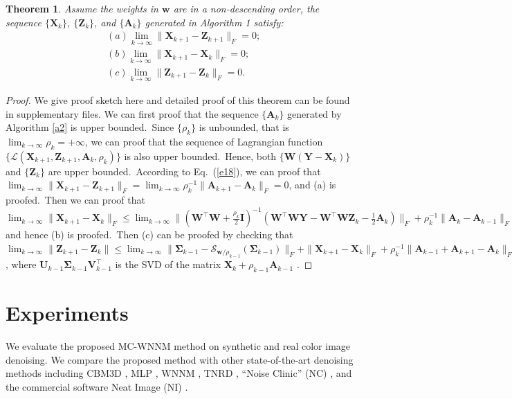 \documentclass[10pt,twocolumn,letterpaper,sort&compress]{article}
\newtheorem{theorem}{Theorem}
\begin{document}
\begin{theorem}
\label{t1}
Assume the weights in $\bm{w}$ are in a non-descending order, the sequence $\{\mathbf{X}_{k}\}$, $\{\mathbf{Z}_{k}\}$, and $\{\mathbf{A}_{k}\}$ generated in Algorithm 1 satisfy:
\begin{align}
&(a) \lim_{k \to \infty} \|\mathbf{X}_{k+1}-\mathbf{Z}_{k+1}\|_{F}=0;
\\
&(b) \lim_{k \to \infty} \|\mathbf{X}_{k+1}-\mathbf{X}_{k}\|_{F}=0;
\\
&(c) \lim_{k \to \infty} \|\mathbf{Z}_{k+1}-\mathbf{Z}_{k}\|_{F}=0.
\end{align}
\end{theorem}
\begin{proof}
We give proof sketch here and detailed proof of this theorem can be found in supplementary files. We can first proof that the sequence $\{\mathbf{A}_{k}\}$ generated by Algorithm \ref{a2} is upper bounded.\ Since $\{\rho_{k}\}$ is unbounded, that is $\lim_{k\to\infty}{\rho_{k}}=+\infty$, we can proof that the sequence of Lagrangian function $\{\mathcal{L}(\mathbf{X}_{k+1},\mathbf{Z}_{k+1},\mathbf{A}_{k},\rho_{k})\}$ is also upper bounded.\
Hence, both $\{\mathbf{W}(\mathbf{Y}-\mathbf{X}_{k})\}$ and $\{\mathbf{Z}_{k}\}$ are upper bounded.\ According to Eq.\ (\ref{e18}), we can proof that 
$
\lim_{k \to \infty} 
\|
\mathbf{X}_{k+1}
-
\mathbf{Z}_{k+1}
\|_{F}
=
\lim_{k \to \infty} 
\rho_{k}^{-1}
\|
\mathbf{A}_{k+1}
-
\mathbf{A}_{k}
\|_{F}
=
0
$,
and (a) is proofed.\ Then we can proof that 
$
\lim_{k \to \infty} 
\|
\mathbf{X}_{k+1}
-
\mathbf{X}_{k}
\|_{F}
\le
\lim_{k \to \infty} 
\|
(\mathbf{W}^{\top}\mathbf{W}
+
\frac{\rho_{k}}{2}
\mathbf{I})^{-1}
(\mathbf{W}^{\top}\mathbf{W}\mathbf{Y}
-
\mathbf{W}^{\top}\mathbf{W}\mathbf{Z}_{k}
-
\frac{1}{2}
\mathbf{A}_{k})
\|_{F}
+
\rho_{k}^{-1}\|
\mathbf{A}_{k}-\mathbf{A}_{k-1}
\|_{F}
=
0
$
and hence (b) is proofed.\ Then (c) can be proofed by checking that 
$
\lim_{k \to \infty} \|\mathbf{Z}_{k+1}-\mathbf{Z}_{k}\|
\le
\lim_{k \to \infty} 
\|
\mathbf{\Sigma}_{k-1}-\mathcal{S}_{\bm{w}/\rho_{k-1}}(\mathbf{\Sigma}_{k-1})
\|_{F}
+
\|
\mathbf{X}_{k+1}-\mathbf{X}_{k}
\|_{F}
+
\rho_{k}^{-1}
\|
\mathbf{A}_{k-1}
+
\mathbf{A}_{k+1}
-
\mathbf{A}_{k}
\|_{F}
=
0
$
,
where $\mathbf{U}_{k-1}\mathbf{\Sigma}_{k-1}\mathbf{V}_{k-1}^{\top}$ is the SVD of the matrix $\mathbf{X}_{k}+\rho_{k-1}\mathbf{A}_{k-1}$
.
\end{proof}

\section{Experiments}
We evaluate the proposed MC-WNNM method on synthetic and real color image denoising. We compare the proposed method with other state-of-the-art denoising methods including CBM3D \cite{cbm3d}, MLP \cite{mlp}, WNNM \cite{wnnm}, TNRD \cite{chen2015learning}, ``Noise Clinic'' (NC) \cite{noiseclinic,ncwebsite}, and the commercial software Neat Image (NI) \cite{neatimage}.
\end{document}
